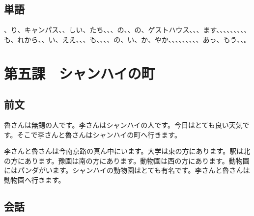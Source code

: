 \documentclass[a5j]{ltjtarticle}
\begin{document}
\subsection*{単語}

\begin{onehalfspace}
  、り、キャンパス、、しい、たち、、、の、、の、ゲストハウス、、、ます、、、、、、、、、も、れから、、い、ええ、、、も、、、、の、い、か、やか、、、、、、、、、あっ、もう、、。
\end{onehalfspace}

\section*{第五課　シャンハイの町}

\subsection*{前文}

魯さんは無錫の人です。李さんはシャンハイの人です。今日はとても良い天気です。そこで李さんと魯さんはシャンハイの町へ行きます。

李さんと魯さんは今南京路の真ん中にいます。大学は東の方にあります。駅は北の方にあります。豫園は南の方にあります。動物園は西の方にあります。動物園にはパンダがいます。シャンハイの動物園はとても有名です。李さんと魯さんは動物園へ行きます。

\subsection*{会話}
\end{document}
